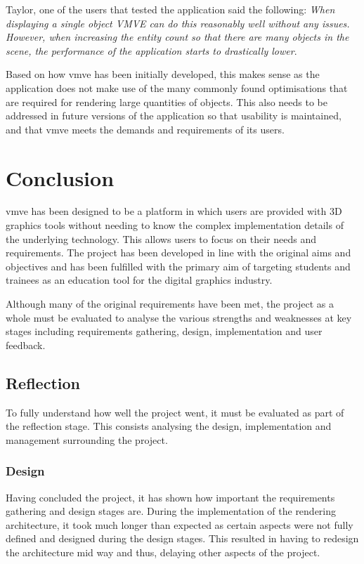 \documentclass[11pt]{article}
\begin{document}
Taylor, one of the users that tested the application said the following:
\textit{When displaying a single object VMVE can do this reasonably well without
any issues. However, when increasing the entity count so that there are many
objects in the scene, the performance of the application starts to drastically
lower}.

Based on how \gls*{vmve} has been initially developed, this makes sense as the
application does not make use of the many commonly found optimisations that are
required for rendering large quantities of objects. This also needs to be
addressed in future versions of the application so that usability is maintained,
and that \gls*{vmve} meets the demands and requirements of its users.

\clearpage
\section{Conclusion} \label{conclusion}

\gls*{vmve} has been designed to be a platform in which users are provided with
3D graphics tools without needing to know the complex implementation details of
the underlying technology. This allows users to focus on their needs and
requirements. The project has been developed in line with the original aims and
objectives and has been fulfilled with the primary aim of targeting students
and trainees as an education tool for the digital graphics industry.


Although many of the original requirements have been met, the project as a whole
must be evaluated to analyse the various strengths and weaknesses at key stages
including requirements gathering, design, implementation and user feedback.

\subsection{Reflection}
To fully understand how well the project went, it must be evaluated as part of
the reflection stage. This consists analysing the design, implementation and 
management surrounding the project.

\subsubsection{Design}
Having concluded the project, it has shown how important the requirements
gathering and design stages are. During the implementation of the rendering
architecture, it took much longer than expected as certain aspects were not
fully defined and designed during the design stages. This resulted in having to
redesign the architecture mid way and thus, delaying other aspects of the
project.
\end{document}
